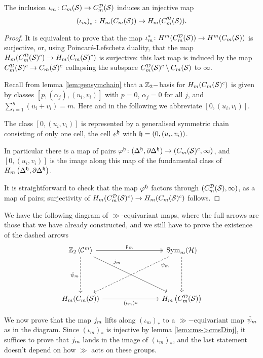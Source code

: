 \begin{lem}
 \label{lem:cms->cmsDinj}
 The inclusion $\iota_m\colon C_m(\mathcal{S})\to C_{m}^{\mathcal{D}}(\mathcal{S})$ induces an injective map
 \[
  \left(\iota_m\right)_*\colon H_m(C_m(\mathcal{S}))\to H_m(C_{m}^{\mathcal{D}}(\mathcal{S})).
 \]
\end{lem}
\begin{proof}
 It is equivalent to prove that the map $\iota_m^*\colon H^m(C_{m}^{\mathcal{D}}(\mathcal{S}))\to H^m(C_m(\mathcal{S}))$ is surjective,
 or, using Poincaré-Lefschetz duality, that the map $H_m(C_{m}^{\mathcal{D}}(\mathcal{S})^c)\to H_m(C_m(\mathcal{S})^c)$
 is surjective: this last map is induced by the map $C_{m}^{\mathcal{D}}(\mathcal{S})^c\to C_m(\mathcal{S})^c$ collapsing the subspace
 $C_{m}^{\mathcal{D}}(\mathcal{S})^c\setminus C_m(\mathcal{S})$ to $\infty$.
 
 Recall from lemma \ref{lem:gensymchain} that a $\mathbb{Z}_2-$basis for $H_m(C_m(\mathcal{S})^c)$
 is given by classes $[p,(\alpha_j),(u_i,v_i)]$ with $p=0$, $\alpha_j=0$ for all $j$,
 and $\sum_{i=1}^g (u_i+v_i)=m$. Here and in the following we abbreviate $[0,(u_i,v_i)]$.
 
 The class $[0,(u_i,v_i)]$ is represented by a generalised symmetric chain consisting of only one cell,
 the cell $e^{\mathfrak{h}}$
 with $\mathfrak{h}=(0,(u_i,v_i))$.
 
 In particular there is a map of pairs
 $\varphi^{\mathfrak{h}}\colon(\Delta^{\mathfrak{h}},\partial\Delta^{\mathfrak{h}})\to (C_m(\mathcal{S})^c,\infty)$, and $[0,(u_i,v_i)]$
 is the image along this map of the fundamental class of $H_m\left(\Delta^{\mathfrak{h}},\partial\Delta^{\mathfrak{h}}\right)$.
 
 It is straightforward to check that the map $\varphi^{\mathfrak{h}}$ factors through
 $(C_{m}^{\mathcal{D}}(\mathcal{S}),\infty)$, as a map of pairs; surjectivity of $H_m(C_{m}^{\mathcal{D}}(\mathcal{S})^c)\to H_m(C_m(\mathcal{S})^c)$ follows.
\end{proof}

We have the following diagram of $\gg$-equivariant maps, where the full arrows are those
that we have already constructed, and we still have to prove the existence of the dashed arrows
\begin{equation}
\label{eq:fulldasheddiagram}
\begin{tikzcd}[column sep=8em,row sep=5em]
  \ZcC{m} \ar[r,"\pr_m",two heads]\ar[d,dashed, swap, "\tpsi_m"]\ar[dr,"\j_m",near start]
  & \Sym_m(\H)\ar[d,dashed ]\ar[dl,dashed,very near start,"\psi_m"]\\
  H_m(\cms)\ar[r,swap,"\pa{\iota_m}*"hook] & H_m\pa{\cmsD}
 \end{tikzcd}
\end{equation}

We now prove that the map $j_m$ lifts along $(\iota_m)_*$
to a $\gg-$equivariant map $\tilde\psi_m$ as in the diagram.
Since $(\iota_m)_*$ is injective by lemma \ref{lem:cms->cmsDinj}, it suffices to prove that $j_m$
lands in the image of $(\iota_m)_*$, and the last statement doesn't depend on how $\gg$ acts on these groups.

